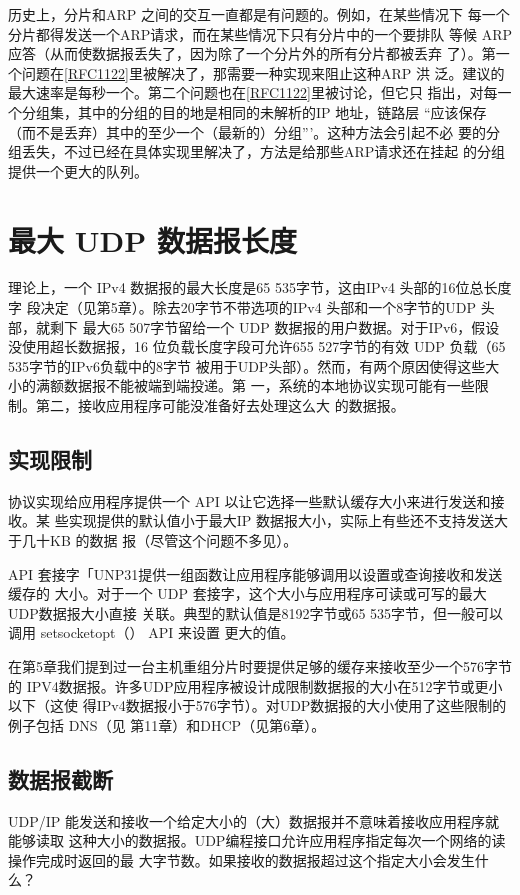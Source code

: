 \begin{tcolorbox}
    历史上，分片和ARP 之间的交互一直都是有问题的。例如，在某些情况下
    每一个分片都得发送一个ARP请求，而在某些情况下只有分片中的一个要排队
    等候 ARP应答（从而使数据报丢失了，因为除了一个分片外的所有分片都被丢弃
    了）。第一个问题在\href{https://www.rfc-editor.org/rfc/rfc1122}{[RFC1122]}里被解决了，那需要一种实现来阻止这种ARP 洪
    泛。建议的最大速率是每秒一个。第二个问题也在\href{https://www.rfc-editor.org/rfc/rfc1122}{[RFC1122]}里被讨论，但它只
    指出，对每一个分组集，其中的分组的目的地是相同的未解析的IP 地址，链路层
    “应该保存（而不是丢弃）其中的至少一个（最新的）分组”’。这种方法会引起不必
    要的分组丢失，不过已经在具体实现里解决了，方法是给那些ARP请求还在挂起
    的分组提供一个更大的队列。
\end{tcolorbox}

\section{最大 UDP 数据报长度}
理论上，一个 IPv4 数据报的最大长度是65 535字节，这由IPv4 头部的16位总长度字
段决定（见第5章）。除去20字节不带选项的IPv4 头部和一个8字节的UDP 头部，就剩下
最大65 507字节留给一个 UDP 数据报的用户数据。对于IPv6，假设没使用超长数据报，16
位负载长度字段可允许655 527字节的有效 UDP 负载（65 535字节的IPv6负载中的8字节
被用于UDP头部）。然而，有两个原因使得这些大小的满额数据报不能被端到端投递。第
一，系统的本地协议实现可能有一些限制。第二，接收应用程序可能没准备好去处理这么大
的数据报。

\subsection{实现限制}
协议实现给应用程序提供一个 API 以让它选择一些默认缓存大小来进行发送和接收。某
些实现提供的默认值小于最大IP 数据报大小，实际上有些还不支持发送大于几十KB 的数据
报（尽管这个问题不多见）。

API 套接字「UNP31提供一组函数让应用程序能够调用以设置或查询接收和发送缓存的
大小。对于一个 UDP 套接字，这个大小与应用程序可读或可写的最大 UDP数据报大小直接
关联。典型的默认值是8192字节或65 535字节，但一般可以调用 setsocketopt（） API 来设置
更大的值。

在第5章我们提到过一台主机重组分片时要提供足够的缓存来接收至少一个576字节的
IPV4数据报。许多UDP应用程序被设计成限制数据报的大小在512字节或更小以下（这使
得IPv4数据报小于576字节）。对UDP数据报的大小使用了这些限制的例子包括 DNS（见
第11章）和DHCP（见第6章）。

\subsection{数据报截断}
UDP/IP 能发送和接收一个给定大小的（大）数据报并不意味着接收应用程序就能够读取
这种大小的数据报。UDP编程接口允许应用程序指定每次一个网络的读操作完成时返回的最
大字节数。如果接收的数据报超过这个指定大小会发生什么？


